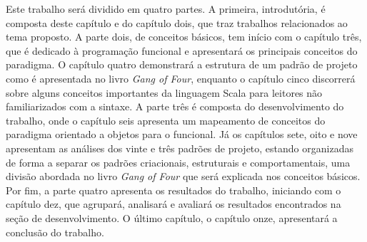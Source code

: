 
Este trabalho será dividido em quatro partes. 
A primeira, introdutória, é composta deste capítulo 
e do capítulo dois, que traz trabalhos relacionados 
ao tema proposto. A parte dois, de conceitos 
básicos, tem início com o capítulo três, que é dedicado 
à programação funcional e apresentará os principais 
conceitos do paradigma. O capítulo quatro demonstrará a 
estrutura de um padrão de projeto como é apresentada 
no livro \textit{Gang of Four}, enquanto o capítulo 
cinco discorrerá sobre alguns conceitos importantes 
da linguagem Scala para leitores não familiarizados 
com a sintaxe. A parte três é composta do desenvolvimento 
do trabalho, onde o capítulo seis apresenta um 
mapeamento de conceitos do paradigma orientado a 
objetos para o funcional. Já os capítulos sete, 
oito e nove apresentam as análises dos vinte e 
três padrões de projeto, estando organizadas 
de forma a separar os padrões criacionais, 
estruturais e comportamentais, uma divisão 
abordada no livro \textit{Gang of Four} que será 
explicada nos conceitos básicos. Por fim, 
a parte quatro apresenta os resultados do 
trabalho, iniciando com o capítulo dez, 
que agrupará, analisará e avaliará os 
resultados encontrados na seção de 
desenvolvimento. O último capítulo, 
o capítulo onze, apresentará a conclusão 
do trabalho.